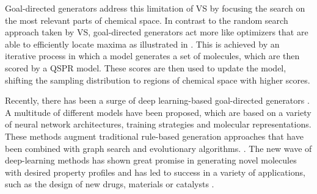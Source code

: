 Goal-directed generators address this limitation of \ac{VS} by focusing the search on the most
relevant parts of chemical space. In contrast to the random search approach taken by \ac{VS},
goal-directed generators act more like optimizers that are able to efficiently locate maxima as
illustrated in . This is achieved by an iterative process in
which a model generates a set of molecules, which are then scored by a \ac{QSPR} model. These scores
are then used to update the model, shifting the sampling distribution to regions of chemical space
with higher scores.

Recently, there has been a surge of deep learning-based goal-directed generators
\citep{eltonDeepLearningMolecular2019,sanchez-lengelingInverseMolecularDesign2018,duMachineLearningaidedGenerative2024}.
A multitude of different models have been proposed, which are based on a variety of neural network
architectures, training strategies and molecular representations. These methods augment traditional
rule-based generation approaches that have been combined with graph search and evolutionary
algorithms. \citep{schneiderComputerbasedNovoDesign2005,schneiderNovoMolecularDesign2013}. The new
wave of deep-learning methods has shown great promise in generating novel molecules with desired
property profiles and has led to success in a variety of applications, such as the design of new drugs,
materials or catalysts \citep{zahrtPredictionHigherselectivityCatalysts2019,daveAutonomousDiscoveryBattery2020,kimDatadrivenElectrolyteDesign2023,moonActiveLearningGuides2024}.


